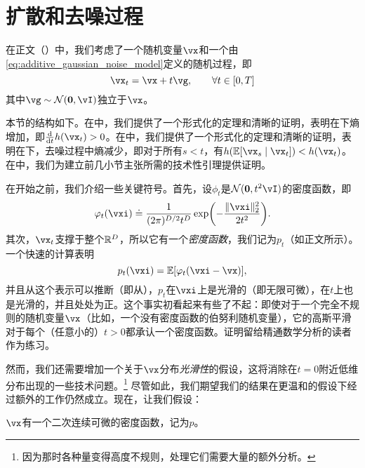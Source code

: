 \documentclass[../../book-main_zh.tex]{subfiles}
\begin{document}
\section{扩散和去噪过程}\label{sec:entropy_diffusion}

在正文（）中，我们考虑了一个随机变量\(\vx\)和一个由\eqref{eq:additive_gaussian_noise_model}定义的随机过程，即
\begin{equation}\label{eq:app_additive_gaussian_noise_model}
    \vx_{t} = \vx + t\vg, \qquad  \forall t \in [0, T]
\end{equation}
其中\(\vg \sim \dNorm(\vzero, \vI)\)独立于\(\vx\)。

本节的结构如下。在中，我们提供了一个形式化的定理和清晰的证明，表明在下熵增加，即\(\odv*{h(\vx_{t})}{t} > 0\)。在中，我们提供了一个形式化的定理和清晰的证明，表明在下，去噪过程中熵减少，即对于所有\(s < t\)，有\(h(\Ex[\vx_{s} \given \vx_{t}]) < h(\vx_{t})\)。在中，我们为建立前几小节主张所需的技术性引理提供证明。

在开始之前，我们介绍一些关键符号。首先，设\(\phi_{t}\)是\(\dNorm(\vzero, t^{2}\vI)\)的密度函数，即
\begin{equation}\label{eq:gaussian_noise_time_t}
    \phi_{t}(\vxi) \doteq \frac{1}{(2\pi)^{D/2}t^{D}}\exp\rp{-\frac{\norm{\vxi}_{2}^{2}}{2t^{2}}}.
\end{equation}
其次，\(\vx_{t}\)支撑于整个\(\mathbb{R}^{D}\)，所以它有一个\textit{密度函数}，我们记为\(p_{t}\)（如正文所示）。一个快速的计算表明
\begin{equation}\label{eq:p_t_representation}
    p_{t}(\vxi) = \Ex[\phi_{t}(\vxi - \vx)],
\end{equation}
并且从这个表示可以推断（即从），\(p_{t}\)在\(\vxi\)上是光滑的（即无限可微），在\(t\)上也是光滑的，并且处处为正。这个事实初看起来有些了不起：即使对于一个完全不规则的随机变量\(\vx\)（比如，一个没有密度函数的伯努利随机变量），它的高斯平滑对于每个（任意小的）\(t > 0\)都承认一个密度函数。证明留给精通数学分析的读者作为练习。

然而，我们还需要增加一个关于\(\vx\)分布\textit{光滑性}的假设，这将消除在\(t=0\)附近低维分布出现的一些技术问题。\footnote{因为那时各种量变得高度不规则，处理它们需要大量的额外分析。} 尽管如此，我们期望我们的结果在更温和的假设下经过额外的工作仍然成立。现在，让我们假设：
\begin{assumption}\label{assumption:entropy_x_density}
    \(\vx\)有一个二次连续可微的密度函数，记为\(p\)。
\end{assumption}
\end{document}
